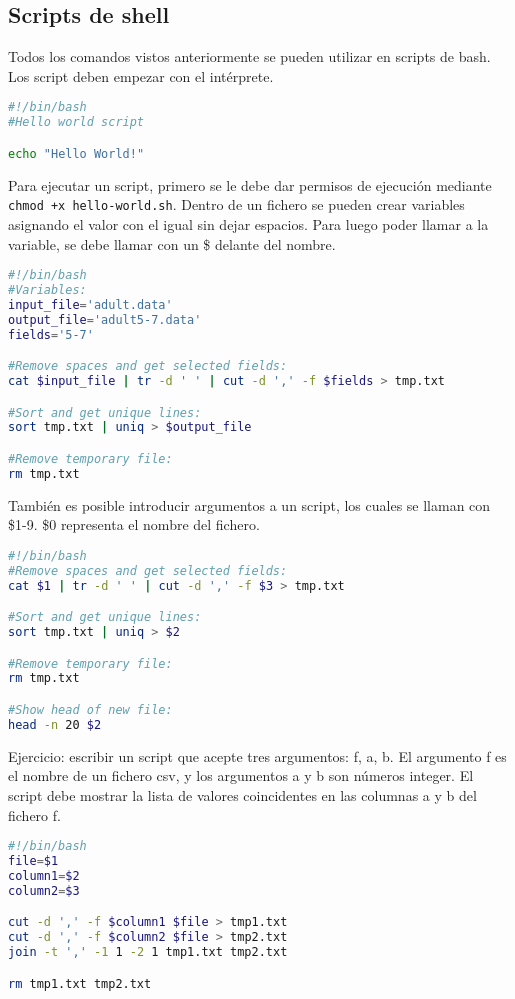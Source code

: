 \subsection{Scripts de shell}
Todos los comandos vistos anteriormente se pueden utilizar en scripts de bash. Los script deben empezar con el intérprete.
\begin{lstlisting}[language=bash]
#!/bin/bash
#Hello world script

echo "Hello World!"
\end{lstlisting}

Para ejecutar un script, primero se le debe dar permisos de ejecución mediante \texttt{chmod +x hello-world.sh}. Dentro de un fichero se pueden crear variables asignando el valor con el igual sin dejar espacios. Para luego poder llamar a la variable, se debe llamar con un \$ delante del nombre.

\begin{lstlisting}[language=bash]
#!/bin/bash
#Variables:
input_file='adult.data'
output_file='adult5-7.data'
fields='5-7'

#Remove spaces and get selected fields:
cat $input_file | tr -d ' ' | cut -d ',' -f $fields > tmp.txt

#Sort and get unique lines:
sort tmp.txt | uniq > $output_file

#Remove temporary file:
rm tmp.txt
\end{lstlisting}

También es posible introducir argumentos a un script, los cuales se llaman con \$1-9. \$0 representa el nombre del fichero.
\begin{lstlisting}[language=bash]
#!/bin/bash
#Remove spaces and get selected fields:
cat $1 | tr -d ' ' | cut -d ',' -f $3 > tmp.txt

#Sort and get unique lines:
sort tmp.txt | uniq > $2

#Remove temporary file:
rm tmp.txt

#Show head of new file:
head -n 20 $2
\end{lstlisting}

Ejercicio: escribir un script que acepte tres argumentos: f, a, b. El argumento f es el nombre de un fichero csv, y los argumentos a y b son números integer. El script debe mostrar la lista de valores coincidentes en las columnas a y b del fichero f.
\begin{lstlisting}[language=bash]
#!/bin/bash
file=$1
column1=$2
column2=$3

cut -d ',' -f $column1 $file > tmp1.txt
cut -d ',' -f $column2 $file > tmp2.txt
join -t ',' -1 1 -2 1 tmp1.txt tmp2.txt

rm tmp1.txt tmp2.txt
\end{lstlisting}

